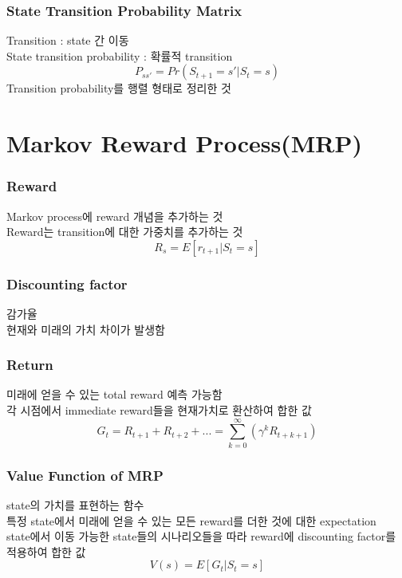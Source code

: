 \documentclass{beamer}
\begin{document}
\begin{frame}
	\frametitle{State Transition Probability Matrix}
		Transition : state 간 이동\\
		State transition probability : 확률적 transition\\
		\begin{equation}\label{state transition probability}
			P_{ss'} = Pr(S_{t+1} = s' | S_t = s)
		\end{equation}
		Transition probability를 행렬 형태로 정리한 것\\
\end{frame}

\section{Markov Reward Process(MRP)}
\begin{frame}
	\frametitle{Reward}
		Markov process에 reward 개념을 추가하는 것\\
		Reward는 transition에 대한 가중치를 추가하는 것\\
		\begin{equation}\label{immediate reward}
			R_s = E[r_{t+1} | S_t = s]
		\end{equation}
\end{frame}

\begin{frame}
	\frametitle{Discounting factor}
		감가율\\
		현재와 미래의 가치 차이가 발생함\\		
\end{frame}

\begin{frame}
	\frametitle{Return}
		미래에 얻을 수 있는 total reward 예측 가능함\\
		각 시점에서 immediate reward들을 현재가치로 환산하여 합한 값\\
		\begin{equation}\label{return}
			G_t = R_{t+1}+R_{t+2}+... = \sum^\infty_{k=0}(\gamma^kR_{t+k+1})
		\end{equation}		
\end{frame}

\begin{frame}
	\frametitle{Value Function of MRP}
		state의 가치를 표현하는 함수\\
		특정 state에서 미래에 얻을 수 있는 모든 reward를 더한 것에 대한 expectation\\
		state에서 이동 가능한 state들의 시나리오들을 따라 reward에 discounting factor를 적용하여 합한 값\\
		\begin{equation}\label{value function}
			V(s) = E[G_{t} | S_{t} = s]
		\end{equation}		
\end{frame}
\end{document}
